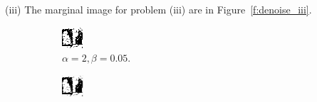 \documentclass{article}
\begin{document}
\noindent
(iii) The marginal image for problem (iii) are in Figure~\ref{f:denoise_iii}.
\begin{figure}[t]
\centering
\begin{subfigure}[t]{0.25\textwidth}
  \centering
  \includegraphics[width=\textwidth]{iii_alpha_2_beta_0.05.bmp}
  \vspace{-0.6cm}
  \caption{$\alpha=2, \beta=0.05$.}
  \label{f:iii-1}
\end{subfigure}
\begin{subfigure}[t]{0.25\textwidth}
  \centering
  \includegraphics[width=\textwidth]{iii_alpha_2_beta_0.2.bmp}

\end{subfigure}
\end{figure}
\end{document}
